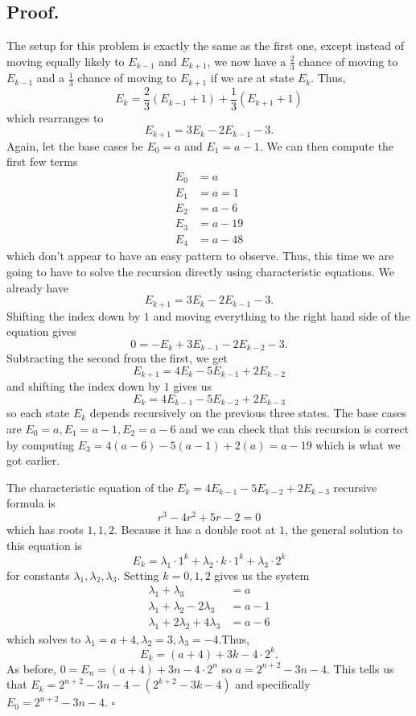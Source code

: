 \documentclass{article}
\begin{document}
\subsection{Proof.} The setup for this problem is exactly the same as the first one, except instead of moving equally likely to $E_{k-1}$ and $E_{k+1}$, we now have a $\frac{2}{3}$ chance of moving to $E_{k-1}$ and a $\frac{1}{3}$ chance of moving to $E_{k+1}$ if we are at state $E_k$. Thus, $$E_k=\frac{2}{3}(E_{k-1}+1)+\frac{1}{3}(E_{k+1}+1)$$ which rearranges to $$E_{k+1}=3E_k-2E_{k-1}-3.$$ Again, let the base cases be $E_0=a$ and $E_1=a-1$. We can then compute the first few terms 
\begin{align*}
E_0&=a\\
E_1&= a=1\\
E_2&= a-6\\
E_3 &= a-19\\
E_4 &= a-48
\end{align*} which don't appear to have an easy pattern to observe. Thus, this time we are going to have to solve the recursion directly using characteristic equations. We already have $$E_{k+1}=3E_k-2E_{k-1}-3.$$ Shifting the index down by $1$ and moving everything to the right hand side of the equation gives $$0=-E_{k}+3E_{k-1}-2E_{k-2}-3.$$ Subtracting the second from the first, we get $$E_{k+1}=4E_k-5E_{k-1}+2E_{k-2}$$ and shifting the index down by $1$ gives us $$E_{k}=4E_{k-1}-5E_{k-2}+2E_{k-3}$$ so each state $E_k$ depends recursively on the previous three states. The base cases are $E_0=a,E_1=a-1,E_2=a-6$ and we can check that this recursion is correct by computing $E_3=4(a-6)-5(a-1)+2(a)=a-19$ which is what we got earlier. 

The characteristic equation of the $E_{k}=4E_{k-1}-5E_{k-2}+2E_{k-3}$ recursive formula is $$r^3-4r^2+5r-2=0$$ which has roots $1,1,2$. Because it has a double root at $1$, the general solution to this equation is $$E_k=\lambda_1\cdot 1^k+\lambda_2\cdot k\cdot 1^k+\lambda_3\cdot 2^k$$ for constants $\lambda_1,\lambda_2,\lambda_3$. Setting $k=0,1,2$ gives us the system 
\begin{align*}
\lambda_1+\lambda_3&=a\\
\lambda_1+\lambda_2-2\lambda_3&=a-1\\
\lambda_1+2\lambda_2+4\lambda_3&=a-6
\end{align*}
which solves to $\lambda_1=a+4,\lambda_2=3,\lambda_3=-4$.Thus, $$E_k=(a+4)+3k-4\cdot 2^k.$$ As before, $0=E_n=(a+4)+3n-4\cdot 2^n$ so $a=2^{n+2}-3n-4$. This tells us that $E_k=2^{n+2}-3n-4-(2^{k+2}-3k-4)$ and specifically $\boxed{E_0=2^{n+2}-3n-4}$. $\square$
\end{document}
